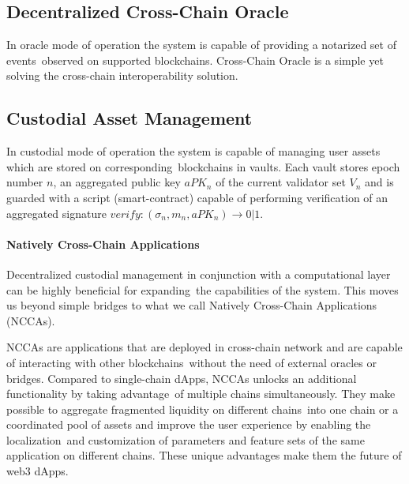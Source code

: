 \subsection{Decentralized Cross-Chain Oracle}\label{subsec:cross-chain-oracle}

In oracle mode of operation the system is capable of providing a notarized set of events\
observed on supported blockchains.
Cross-Chain Oracle is a simple yet solving the cross-chain interoperability solution.

\subsection{Custodial Asset Management}\label{subsec:custodial-asset-management}

In custodial mode of operation the system is capable of managing user assets which are stored on corresponding\
blockchains in vaults.
Each vault stores epoch number $n$, an aggregated public key $aPK_n$ of the current validator set $V_n$ and
is guarded with a script (smart-contract) capable of performing verification of
an aggregated signature ${verify: (\sigma_n, m_n, aPK_n) \rightarrow 0 | 1}$.


\paragraph{Natively Cross-Chain Applications}

Decentralized custodial management in conjunction with a computational layer can be highly beneficial for expanding\
the capabilities of the system.
This moves us beyond simple bridges to what we call Natively Cross-Chain Applications (NCCAs).

NCCAs are applications that are deployed in cross-chain network and are capable of interacting with other blockchains\
without the need of external oracles or bridges.
Compared to single-chain dApps, NCCAs unlocks an additional functionality by taking advantage\
of multiple chains simultaneously.
They make possible to aggregate fragmented liquidity on different chains\
into one chain or a coordinated pool of assets and improve the user experience by enabling the localization\
and customization of parameters and feature sets of the same application on different chains.
These unique advantages make them the future of web3 dApps.
